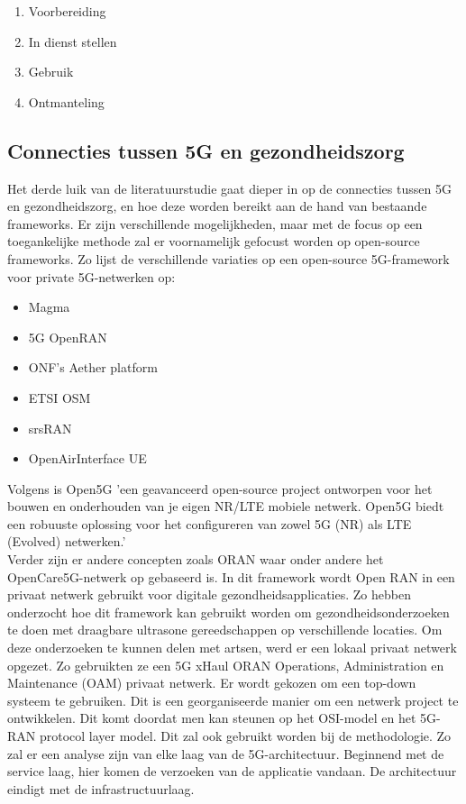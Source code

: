 \begin{enumerate}
  \item Voorbereiding
  \item In dienst stellen
  \item Gebruik
  \item Ontmanteling
\end{enumerate}



\subsection{Connecties tussen 5G en gezondheidszorg}

Het derde luik van de literatuurstudie gaat dieper in op de connecties tussen 5G en gezondheidszorg, en hoe deze worden bereikt aan de hand van bestaande frameworks. Er zijn verschillende mogelijkheden, maar met de focus op een toegankelijke methode zal er voornamelijk gefocust worden op open-source frameworks. Zo lijst \textcite{Eswaran2022} de verschillende variaties op een open-source 5G-framework voor private 5G-netwerken op:

\begin{itemize}
  \item Magma
  \item 5G OpenRAN
  \item ONF's Aether platform
  \item ETSI OSM
  \item srsRAN
  \item OpenAirInterface UE
\end{itemize}

Volgens \textcite{Open5GS2024} is Open5G 'een geavanceerd open-source project ontworpen voor het bouwen en onderhouden van je eigen NR/LTE mobiele netwerk. Open5G biedt een robuuste oplossing voor het configureren van zowel 5G (NR) als LTE (Evolved) netwerken.' \\ Verder zijn er andere concepten zoals ORAN waar onder andere het OpenCare5G-netwerk op gebaseerd is. In dit framework wordt Open RAN in een privaat netwerk gebruikt voor digitale gezondheidsapplicaties. Zo hebben \textcite{de2023opencare5g} onderzocht hoe dit framework kan gebruikt worden om gezondheidsonderzoeken te doen met draagbare ultrasone gereedschappen op verschillende locaties. Om deze onderzoeken te kunnen delen met artsen, werd er een lokaal privaat netwerk opgezet. Zo gebruikten ze een 5G xHaul ORAN Operations, Administration en Maintenance (OAM) privaat netwerk. Er wordt gekozen om een top-down systeem te gebruiken. Dit is een georganiseerde manier om een netwerk project te ontwikkelen. Dit komt doordat men kan steunen op het OSI-model en het 5G-RAN protocol layer model. Dit zal ook gebruikt worden bij de methodologie. Zo zal er een analyse zijn van elke laag van de 5G-architectuur. Beginnend met de service laag, hier komen de verzoeken van de applicatie vandaan. De architectuur eindigt met de infrastructuurlaag. \autocite{de2023opencare5g}


